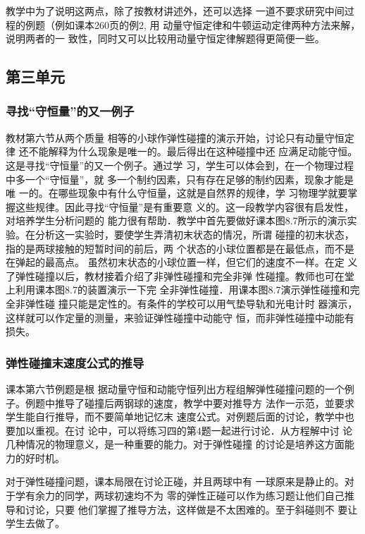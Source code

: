 教学中为了说明这两点，除了按教材讲述外，还可以选择
一道不要求研究中间过程的例题（例如课本260页的例2, 用
动量守恒定律和牛顿运动定律两种方法来解，说明两者的一
致性，同时又可以比较用动量守恒定律解题得更简便一些。

\subsection{第三单元}
\subsubsection{寻找“守恒量”的又一例子}

教材第六节从两个质量
相等的小球作弹性碰撞的演示开始，讨论只有动量守恒定律
还不能解释为什么现象是唯一的。最后得出在这种碰撞中还
应满足动能守恒。这是寻找“守恒量”的又一个例子。通过学
习，学生可以体会到，在一个物理过程中多一个“守恒量”，就
多一个制约因素，只有存在足够的制约因素，现象才能是唯
一的。在哪些现象中有什么守恒量，这就是自然界的规律，学
习物理学就要掌握这些规律。因此寻找“守恒量”是有重要意
义的。这一段教学内容很有启发性，对培养学生分析问题的
能力很有帮助．教学中首先要做好课本图8.7所示的演示实
验。在分析这一实验时，要使学生弄清初末状态的情况，所谓
碰撞的初末状态，指的是两球接触的短暂时间的前后，两
个状态的小球位置都是在最低点，而不是在弹起的最高点。
虽然初末状态的小球位置一样，但它们的速度不一样。在定
义了弹性碰撞以后，教材接着介绍了非弹性碰撞和完全非弹
性碰撞。教师也可在堂上利用课本图8.7的装置演示一下完
全非弹性碰撞．用课本图8.7演示弹性碰撞和完全非弹性碰
撞只能是定性的。有条件的学校可以用气垫导轨和光电计时
器演示，这样就可以作定量的测量，来验证弹性碰撞中动能守
恒，而非弹性碰撞中动能有损失。

\subsubsection{弹性碰撞末速度公式的推导}

课本第六节例题是根
据动量守恒和动能守恒列出方程组解弹性碰撞问题的一个例
子。例题中推导了碰撞后两钢球的速度，教学中要对推导方
法作一示范，並要求学生能自行推导，而不要简单地记忆末
速度公式。对例题后面的讨论，教学中也要加以重视。在讨
论中，可以将练习四的第4题一起进行讨论．从方程解中讨
论几种情况的物理意义，是一种重要的能力。对于弹性碰撞
的讨论是培养这方面能力的好时机。

对于弹性碰撞问题，课本局限在讨论正碰，并且两球中有
一球原来是静止的。对于学有余力的同学，两球初速均不为
零的弹性正碰可以作为练习题让他们自己推导和讨论，只要
他们掌握了推导方法，这样做是不太困难的。至于斜碰则不
要让学生去做了。

